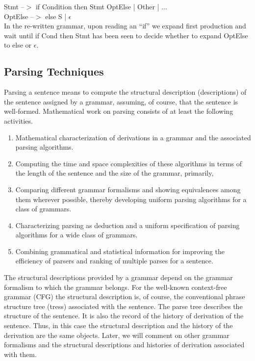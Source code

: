 \begin{enumerate}
Stmt –$>$ if Condition then Stmt OptElse | Other | ...\\
OptElse –$>$ else S | $\epsilon$ \\
In the re-written grammar, upon reading an “if” we expand first production and wait until if Cond then Stmt has been seen to decide whether to expand OptElse to else or $\epsilon$.



\end{enumerate}




\subsection{Parsing Techniques}
Parsing a sentence means to compute the structural description (descriptions) of the sentence assigned by a grammar, assuming, of course, that the sentence is well-formed. Mathematical work on parsing consists of at least the following activities.\\

\begin{enumerate}
\item Mathematical characterization of derivations in a grammar and the associated parsing algorithms. 

\item Computing the time and space complexities of these algorithms in terms of the length of the sentence and the size of the grammar, primarily,

\item Comparing different grammar formalisms and showing equivalences among them wherever possible, thereby developing uniform parsing algorithms for a class of grammars.

\item Characterizing parsing as deduction and a uniform specification of parsing algorithms for a wide class of grammars.


\item Combining grammatical and statistical information for improving the efficiency of parsers and ranking of multiple parses for a sentence.

\end{enumerate}

The structural descriptions provided by a grammar depend on the grammar formalism to which the grammar belongs. For the well-known context-free grammar (CFG) the structural description is, of course, the conventional phrase structure tree (tress) associated with the sentence. The parse tree describes the structure of the sentence. It is also the record of the history of derivation of the sentence. Thus, in this case the structural description and the history of the derivation are the same objects. Later, we will comment on other grammar formalisms and the structural descriptions and histories of derivation associated with them. 





